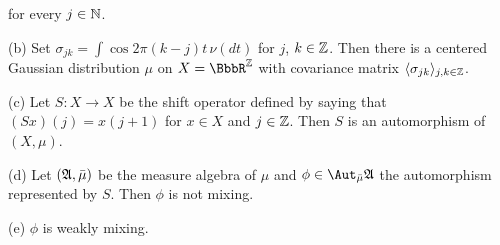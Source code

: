
\noindent for every $j\in\Bbb N$.

(b) Set $\sigma_{jk}=\int\cos 2\pi(k-j)t\,\nu(dt)$ for $j$, $k\in\Bbb Z$.
Then there is a centered Gaussian distribution $\mu$ on $X=\BbbR^{\Bbb Z}$
with covariance matrix $\langle\sigma_{jk}\rangle_{j,k\in\Bbb Z}$.

(c) Let $S:X\to X$ be the shift operator defined by saying that
$(Sx)(j)=x(j+1)$ for $x\in X$ and $j\in\Bbb Z$.   Then $S$ is an
automorphism of $(X,\mu)$.

(d) Let $(\frak A,\bar\mu)$ be the measure
algebra of $\mu$ and $\phi\in\AmuA$ the automorphism represented by
$S$.   Then $\phi$ is not mixing.

(e) $\phi$ is weakly mixing.

